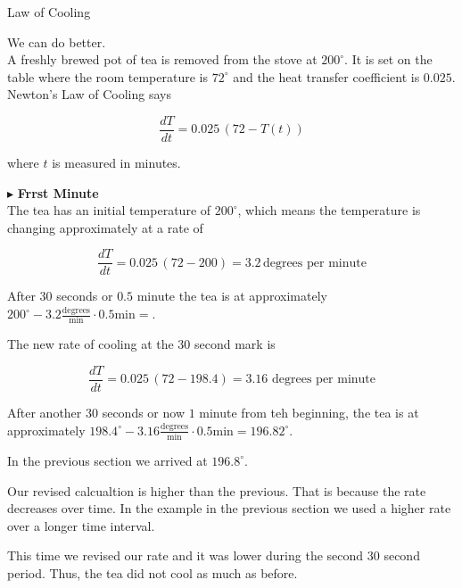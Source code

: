 \documentclass{ximera}
\begin{document}
\begin{example} Law of Cooling 



We can do better. \\



A freshly brewed pot of tea is removed from the stove at $200^{\circ}$.  It is set on the table where the room temperature is $72^{\circ}$ and the heat transfer coefficient is $0.025$. \\


Newton's Law of Cooling says

\[
\frac{dT}{dt} = 0.025 \, (72 - T(t))
\]


where $t$ is measured in minutes.


$\blacktriangleright$ \textbf{Frrst Minute} \\

The tea has an initial temperature of $200^{\circ}$, which means the temperature is changing approximately at a rate of 


\[
\frac{dT}{dt} = 0.025 \, (72 - 200) = 3.2 \, \text{degrees per minute}
\]


After $30$ seconds or $0.5$ minute the tea is at approximately $200^{\circ} - 3.2 \frac{\text{degrees}}{\text{min}} \cdot 0.5 \text{min} = $.


The new rate of cooling at the $30$ second mark is


\[
\frac{dT}{dt} = 0.025 \, (72 - 198.4) = 3.16 \, \, \text{degrees per minute}
\]



After another $30$ seconds or now $1$ minute from teh beginning, the tea is at approximately $198.4^{\circ} - 3.16 \frac{\text{degrees}}{\text{min}} \cdot 0.5 \text{min} = 196.82^{\circ}$.


In the previous section we arrived at $196.8^{\circ}$.

\end{example}





\begin{observation}

Our revised calcualtion is higher than the previous.  That is because the rate decreases over time.  In the example in the previous section we used a higher rate over a longer time interval.

This time we revised our rate and it was lower during the second $30$ second period.  Thus, the tea did not cool as much as before.
\end{observation}
\end{document}
